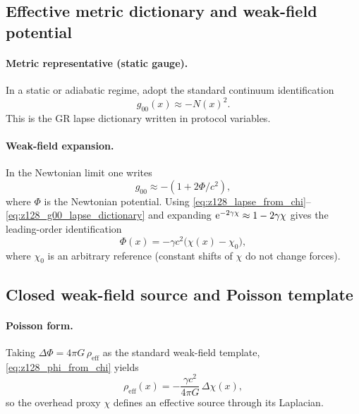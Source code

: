 \subsection{Effective metric dictionary and weak-field potential}
\label{subsec:z128_metric_dictionary}

\paragraph{Metric representative (static gauge).}
\InterfaceTag In a static or adiabatic regime, adopt the standard continuum identification
\begin{equation}
\label{eq:z128_g00_lapse_dictionary}
g_{00}(x)\approx -N(x)^2.
\end{equation}
This is the GR lapse dictionary written in protocol variables.

\paragraph{Weak-field expansion.}
\InterfaceTag In the Newtonian limit one writes
\[
g_{00}\approx -(1+2\Phi/c^2),
\]
where $\Phi$ is the Newtonian potential.
Using \eqref{eq:z128_lapse_from_chi}--\eqref{eq:z128_g00_lapse_dictionary} and expanding $\mathrm{e}^{-2\gamma\chi}\approx 1-2\gamma\chi$ gives the leading-order identification
\begin{equation}
\label{eq:z128_phi_from_chi}
\Phi(x)= -\gamma c^2\bigl(\chi(x)-\chi_0\bigr),
\end{equation}
where $\chi_0$ is an arbitrary reference (constant shifts of $\chi$ do not change forces).

\subsection{Closed weak-field source and Poisson template}
\label{subsec:z128_poisson_template}

\paragraph{Poisson form.}
\InterfaceTag Taking $\Delta\Phi=4\pi G\,\rho_{\mathrm{eff}}$ as the standard weak-field template, \eqref{eq:z128_phi_from_chi} yields
\begin{equation}
\label{eq:z128_rho_eff_from_chi}
\rho_{\mathrm{eff}}(x)=-\frac{\gamma c^2}{4\pi G}\,\Delta\chi(x),
\end{equation}
so the overhead proxy $\chi$ defines an effective source through its Laplacian.

